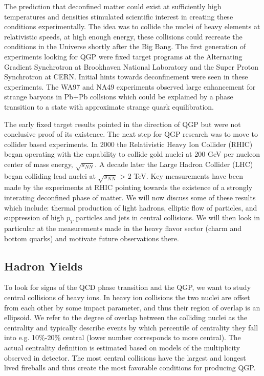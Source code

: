 The prediction that deconfined matter could exist at sufficiently high temperatures and densities stimulated scientific interest in creating these conditions experimentally. The idea was to collide the nuclei of heavy elements at relativistic speeds, at high enough energy, these collisions could recreate the conditions in the Universe shortly after the Big Bang. The first generation of experiments looking for QGP were fixed target programs at the Alternating Gradient Synchrotron at Brookhaven National Laboratory and the Super Proton Synchrotron at CERN. Initial hints towards deconfinement were seen in these experiments. The WA97 and NA49 experiments observed large enhancement for strange baryons in Pb+Pb collsions which could be explained by a phase transition to a state with approximate strange quark equilibration.

The early fixed target results pointed in the direction of QGP but were not conclusive proof of its existence. The next step for QGP research was to move to collider based experiments. In 2000 the Relativistic Heavy Ion Collider (RHIC) began operating with the capability to collide gold nuclei at 200 GeV per nucleon center of mass energy, $\sqrt{s_{NN}}$. A decade later the Large Hadron Collider (LHC) began colliding lead nuclei at $\sqrt{s_{NN}}$ > 2 TeV. Key measurements have been made by the experiments at RHIC pointing towards the existence of a strongly interating deconfined phase of matter. We will now discuss some of these results which include: thermal production of light hadrons, elliptic flow of particles, and suppression of high $p_T$ particles and jets in central collisions. We will then look in particular at the measurements made in the heavy flavor sector (charm and bottom quarks) and motivate future observations there.

\subsection{Hadron Yields}

To look for signs of the QCD phase transition and the QGP, we want to study central collisions of heavy ions. In heavy ion collisions the two nuclei are offset from each other by some impact parameter, and thus their region of overlap is an ellipsoid. We refer to the degree of overlap between the colliding nuclei as the centrality and typically describe events by which percentile of centrality they fall into e.g. 10\%-20\% central (lower number corresponds to more central). The actual centrality definition is estimated based on models of the multiplicity observed in detector. The most central collisions have the largest and longest lived fireballs and thus create the most favorable conditions for producing QGP. 

